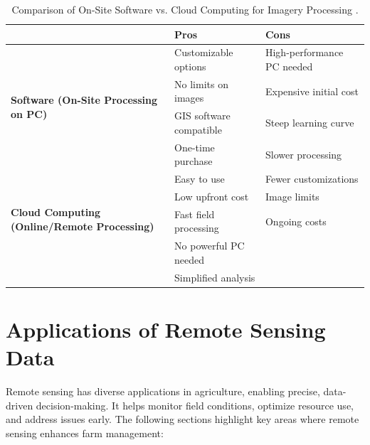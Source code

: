 \begin{table}[h]
    \centering
    \renewcommand{\arraystretch}{1.5} %
    \setlength{\tabcolsep}{8pt} %
    \begin{tabular}{|p{3cm}|p{5.5cm}|p{5.5cm}|}
    \hline
     & \textbf{Pros} & \textbf{Cons} \\ \hline
    
     \multirow{4}{*}{\parbox{2.8cm}{\centering\textbf{Software (On-Site Processing on PC)}}}    & Customizable options & High-performance PC needed \\ \cline{2-3}
    & No limits on images & Expensive initial cost \\ \cline{2-3}
    & GIS software compatible & Steep learning curve \\ \cline{2-3}
    & One-time purchase & Slower processing \\ \hline
    
    \multirow{4}{*}{\parbox{2.8cm}{\centering\textbf{Cloud Computing (Online/Remote Processing)}}}    & Easy to use & Fewer customizations \\ \cline{2-3}
    & Low upfront cost & Image limits \\ \cline{2-3}
    & Fast field processing & Ongoing costs \\ \cline{2-3}
    & No powerful PC needed & \\ \cline{2-3}
    & Simplified analysis & \\ \hline
    \end{tabular}
    \caption{Comparison of On-Site Software vs. Cloud Computing for Imagery Processing \parencite{olson2021review}.}
    \label{tab:ProcessingMethodComparison}
    \end{table}
    

\section{Applications of Remote Sensing Data}
Remote sensing has diverse applications in agriculture, enabling precise, data-driven decision-making. It helps monitor field conditions, optimize resource use, and address issues early. The following sections highlight key areas where remote sensing enhances farm management:

